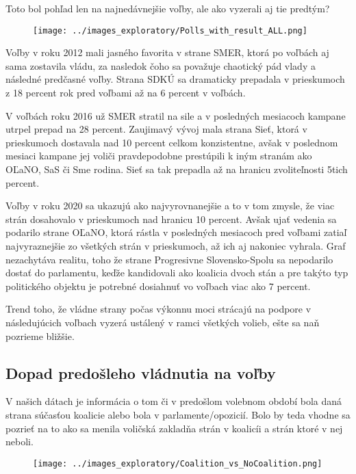 \documentclass[main.tex]{subfiles}
\begin{document}
Toto bol pohľad len na najnedávnejšie voľby, ale ako vyzerali aj tie predtým?

\clearpage


\begin{figure}[!htbp]
    \centering
    \texttt{[image: ../images\_exploratory/Polls\_with\_result\_ALL.png]}
    \caption{}
    \label{fig:example}
\end{figure}

Voľby v roku 2012 mali jasného favorita v strane SMER, ktorá po voľbách aj sama zostavila vládu, za nasledok čoho sa považuje chaotický pád vlady a následné predčasné voľby. Strana SDKÚ sa dramaticky prepadala v prieskumoch z 18 percent rok pred voľbami až na 6 percent v voľbách. 

V voľbách roku 2016 už SMER stratil na sile a v posledných mesiacoch kampane utrpel prepad na 28 percent. Zaujimavý vývoj mala strana Sieť, ktorá v prieskumoch dostavala nad 10 percent celkom konzistentne, avšak v poslednom mesiaci kampane jej voliči pravdepodobne prestúpili k iným stranám ako OĽaNO, SaS či Sme rodina. Sieť sa tak prepadla až na hranicu zvoliteľnosti 5tich percent.

Voľby v roku 2020 sa ukazujú ako najvyrovnanejšie a to v tom zmysle, že viac strán dosahovalo v prieskumoch nad hranicu 10 percent. Avšak ujať vedenia sa podarilo strane OĽaNO, ktorá rástla v posledných mesiacoch pred voľbami zatiaľ najvyraznejšie zo všetkých strán v prieskumoch, až ich aj nakoniec vyhrala. Graf nezachytáva realitu, toho že strane Progresivne Slovensko-Spolu sa nepodarilo dostať do parlamentu, keďže kandidovali ako koalicia dvoch stán a pre takýto typ politického objektu je potrebné dosiahnuť vo voľbach viac ako 7 percent. 

Trend toho, že vládne strany počas výkonnu moci strácajú na podpore v následujúcich voľbach vyzerá ustálený v ramci všetkých volieb, ešte sa naň pozrieme bližšie. 

\subsection{Dopad predošleho vládnutia na voľby}

V našich dátach je informácia o tom či v predošlom volebnom období bola daná strana súčasťou koalicie alebo bola v parlamente/opozicií. Bolo by teda vhodne sa pozrieť na to ako sa menila voličská zakladňa strán v koalicíi a strán ktoré v nej neboli. 
\begin{figure}[!htbp]
    \centering
    \texttt{[image: ../images\_exploratory/Coalition\_vs\_NoCoalition.png]}
    \caption{}
    \label{fig:example}
\end{figure}
\end{document}
